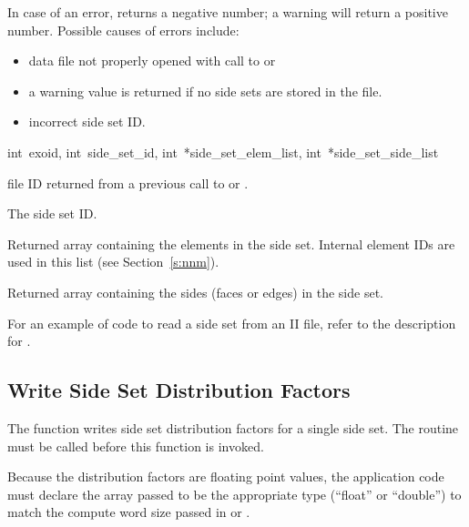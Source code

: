 In case of an error,  returns a negative 
number; a warning will return a positive number. 
Possible causes of errors include:

\begin{itemize}
 \item data file not properly opened with call to 
 or 

 \item a warning value is returned if no side sets are stored 
in the file.

 \item incorrect side set ID.
\end{itemize}

{int~exoid, 
int~side_set_id, 
int~*side_set_elem_list, 
int~*side_set_side_list}

\begin{parameters}
\item[{int exoid \R{}}]
\exo{} file ID returned from a previous call to  
or .

\item[{int side_set_id \R{}}]
The side set ID.

\item[{int* side_set_elem_list \W{}}]
Returned array containing the elements in the side set. Internal 
element IDs are used in this list (see  Section~\ref{s:nnm}).

\item[{int* side_set_side_list \W{}}]
Returned array containing the sides (faces or edges) in the 
side set.
\end{parameters}

For an example of code to read a side set from an \exo{} 
II file, refer to the description for .




\subsection{Write Side Set Distribution Factors}

The function  writes side set
distribution factors for a single side set. The routine
 must be called before this function
is invoked.


Because the distribution factors are floating point values, the
application code must declare the array passed to be the appropriate
type (``float'' or ``double'') to match the compute word size passed
in  or .

